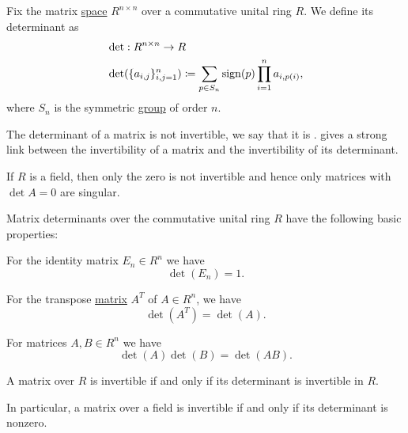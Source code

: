 \begin{definition}\label{def:matrix_determinant}\cite[215]{Knapp2016BAlg}
  Fix the matrix \hyperref[def:algebra_of_matrices]{space} \( R^{n \times n} \) over a commutative unital ring \( R \). We define its determinant as
  \begin{align*}
    &\det: R^{n \times n} \to R \\
    &\det(\{ a_{i,j} \}_{i,j=1}^n) \coloneqq \sum_{p \in S_n} \operatorname{sign}(p) \prod_{i=1}^n a_{i,p(i)},
  \end{align*}
  where \( S_n \) is the symmetric \hyperref[def:symmetric_group]{group} of order \( n \).

  The determinant of a matrix is not invertible, we say that it is .  gives a strong link between the invertibility of a matrix and the invertibility of its determinant.

  If \( R \) is a field, then only the zero is not invertible and hence only matrices with \( \det A = 0 \) are singular.
\end{definition}

\begin{proposition}\label{def:matrix_determinant_properties}\cite[proposition 5.1]{Knapp2016BAlg}
  Matrix determinants over the commutative unital ring \( R \) have the following basic properties:
  \begin{propenum}
     For the identity matrix \( E_n \in R^n \) we have
    \begin{equation*}
      \det(E_n) = 1.
    \end{equation*}

     For the transpose \hyperref[def:matrix_transpose]{matrix} \( A^T \) of \( A \in R^n \), we have
    \begin{equation*}
      \det(A^T) = \det(A).
    \end{equation*}

     For matrices \( A, B \in R^n \) we have
    \begin{equation*}
      \det(A) \det(B) = \det(AB).
    \end{equation*}
  \end{propenum}
\end{proposition}

\begin{proposition}\label{thm:matrix_invertible_iff_nonsingular}\cite[corollary 5.5]{Knapp2016BAlg}
  A matrix over \( R \) is invertible if and only if its determinant is invertible in \( R \).

  In particular, a matrix over a field is invertible if and only if its determinant is nonzero.
\end{proposition}

